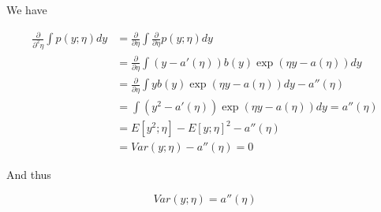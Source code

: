 \begin{answer}
    We have

$$
\begin{aligned}
\frac{\partial }{\partial^2 \eta}\int
p(y;\eta)dy &= \frac{\partial}{\partial \eta}\int\frac{\partial}{\partial \eta }p(y;\eta)dy\\
&= \frac{\partial}{\partial \eta}\int (y - a'(\eta))b(y) \exp(\eta y - a(\eta))dy\\
&= \frac{\partial}{\partial \eta}\int yb(y)  \exp(\eta y - a(\eta))dy - a''(\eta)\\
&= \int (y^2 - a'(\eta)) \exp(\eta y - a(\eta))dy = a''(\eta)\\
&= E[y^2;\eta] - E[y;\eta]^2 - a''(\eta)\\
&= Var(y;\eta) - a''(\eta) = 0
\end{aligned}
$$

And thus

$$
Var(y;\eta) = a''(\eta)
$$

\end{answer}
